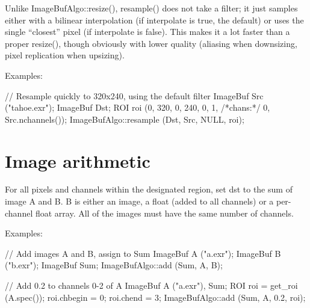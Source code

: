 Unlike {\cf ImageBufAlgo::resize()}, {\cf resample()} does not take a filter; it
just samples either with a bilinear interpolation (if {\cf interpolate} is
{\cf true}, the default) or uses the single ``closest'' pixel (if
{\cf interpolate} is {\cf false}).  This makes it a lot faster than a proper
{\cf resize()}, though obviously with lower quality (aliasing when
downsizing, pixel replication when upsizing).

\smallskip
\noindent Examples:
\begin{code}
    // Resample quickly to 320x240, using the default filter
    ImageBuf Src ("tahoe.exr");
    ImageBuf Dst;
    ROI roi (0, 320, 0, 240, 0, 1, /*chans:*/ 0, Src.nchannels());
    ImageBufAlgo::resample (Dst, Src, NULL, roi);
\end{code}
\apiend



\section{Image arithmetic}
\label{sec:iba:arith}

 

For all pixels and channels within the designated region, set
{\cf dst} to the sum of image {\cf A} and {\cf B}.  {\cf B} is either an image,
a float (added to all channels) or a per-channel float array.
All of the images must have the same number of channels.

\smallskip
\noindent Examples:
\begin{code}
    // Add images A and B, assign to Sum
    ImageBuf A ("a.exr");
    ImageBuf B ("b.exr");
    ImageBuf Sum;
    ImageBufAlgo::add (Sum, A, B);

    // Add 0.2 to channels 0-2 of A
    ImageBuf A ("a.exr"), Sum;
    ROI roi = get_roi (A.spec());
    roi.chbegin = 0;  roi.chend = 3;
    ImageBufAlgo::add (Sum, A, 0.2, roi);
\end{code}
\apiend



